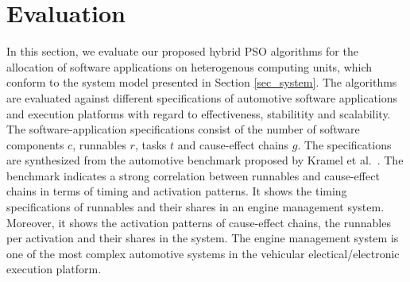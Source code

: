 \section{Evaluation}\label{sec_evaluation}
In this section, we evaluate our proposed hybrid PSO algorithms for the allocation of software applications on heterogenous computing units, which conform to the system model presented in Section \ref{sec_system}. The algorithms are evaluated against different specifications of automotive software applications and execution platforms with regard to effectiveness, stabilitity and scalability. The software-application specifications consist of the number of software components $c$, runnables $r$, tasks $t$ and cause-effect chains $g$.  The specifications are synthesized from the automotive benchmark proposed by Kramel et al.~\cite{Kramer2015RealFree}. The benchmark indicates a strong correlation between runnables and cause-effect chains in terms of timing and activation patterns. It shows the timing specifications of runnables and their shares in an engine management system. Moreover, it shows the activation patterns of cause-effect chains, the runnables per activation and their shares in the system. The engine management system is one of the most complex automotive systems in the vehicular electical/electronic execution platform. 

